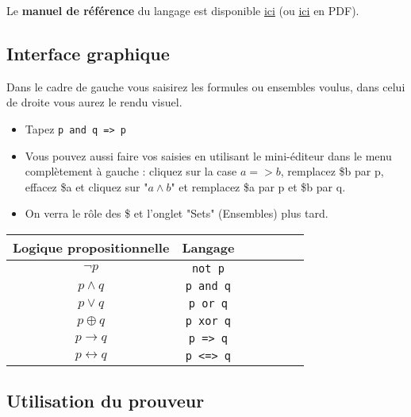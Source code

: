 \medskip
Le {\bf manuel de référence} du langage est disponible \href{https://www.irit.fr/touist/doc/reference-manual.html}{ici} (ou \href{https://www.irit.fr/touist/doc/reference-manual.pdf}{ici} en PDF).

\subsection{Interface graphique}
Dans le cadre de gauche vous saisirez les formules ou ensembles voulus, dans celui de droite vous aurez le rendu visuel. 
\begin{itemize}
\item Tapez \verb?p and q => p?
\item Vous pouvez aussi faire vos saisies en utilisant le mini-éditeur dans le menu complètement à gauche : cliquez sur la case $a => b$, remplacez \$b par p, effacez \$a et cliquez sur "$a\wedge b$" et remplacez \$a par p et \$b par q.
\item On verra le rôle des \$ et l'onglet "Sets" (Ensembles) plus tard. 
\end{itemize}

\begin{center}
	\begin{tabular}{|c|c|c|c|c|c|c|}
		\hline
		 Logique propositionnelle & Langage \touist  \\ \hline
		 $\neg p$ & \texttt{not p} \\ \hline
		 $p \wedge q$ & \texttt{p and q} \\ \hline
		 $p \vee q$ & \texttt{p or q} \\ \hline
		 $p \oplus q$ & \texttt{p xor q} \\ \hline
		 $p \rightarrow q$ & \texttt{p => q} \\ \hline
		 $p \leftrightarrow q$ & \texttt{p <=> q} \\ \hline
	\end{tabular}
\end{center}

\subsection{Utilisation du prouveur}
